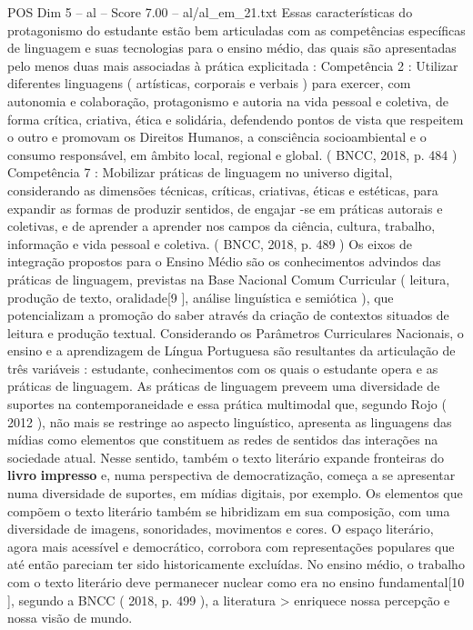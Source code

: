 \begin{textsample}{POS Dim 5 – al – Score 7.00 – al/al\_em\_21.txt}
Essas características do protagonismo do estudante estão bem articuladas com as competências específicas de linguagem e suas tecnologias para o ensino médio, das quais são apresentadas pelo menos duas mais associadas à prática explicitada : Competência 2 : Utilizar diferentes linguagens ( artísticas, corporais e verbais ) para exercer, com autonomia e colaboração, protagonismo e autoria na vida pessoal e coletiva, de forma crítica, criativa, ética e solidária, defendendo pontos de vista que respeitem o outro e promovam os Direitos Humanos, a consciência socioambiental e o consumo responsável, em âmbito local, regional e global. ( BNCC, 2018, p. 484 ) Competência 7 : Mobilizar práticas de linguagem no universo digital, considerando as dimensões técnicas, críticas, criativas, éticas e estéticas, para expandir as formas de produzir sentidos, de engajar -se em práticas autorais e coletivas, e de aprender a aprender nos campos da ciência, cultura, trabalho, informação e vida pessoal e coletiva. ( BNCC, 2018, p. 489 ) Os eixos de integração propostos para o Ensino Médio são os conhecimentos advindos das práticas de linguagem, previstas na Base Nacional Comum Curricular ( leitura, produção de texto, oralidade[9 ], análise linguística e semiótica ), que potencializam a promoção do saber através da criação de contextos situados de leitura e produção textual.
Considerando os Parâmetros Curriculares Nacionais, o ensino e a aprendizagem de Língua Portuguesa são resultantes da articulação de três variáveis : estudante, conhecimentos com os quais o estudante opera e as práticas de linguagem.
As práticas de linguagem preveem uma diversidade de suportes na contemporaneidade e essa prática multimodal que, segundo Rojo ( 2012 ), não mais se restringe ao aspecto linguístico, apresenta as linguagens das mídias como elementos que constituem as redes de sentidos das interações na sociedade atual.
Nesse sentido, também o texto literário expande fronteiras do \textbf{livro} \textbf{impresso} e, numa perspectiva de democratização, começa a se apresentar numa diversidade de suportes, em mídias digitais, por exemplo.
Os elementos que compõem o texto literário também se hibridizam em sua composição, com uma diversidade de imagens, sonoridades, movimentos e cores.
O espaço literário, agora mais acessível e democrático, corrobora com representações populares que até então pareciam ter sido historicamente excluídas.
No ensino médio, o trabalho com o texto literário deve permanecer nuclear como era no ensino fundamental[10 ], segundo a BNCC ( 2018, p. 499 ), a literatura > enriquece nossa percepção e nossa visão de mundo.

\end{textsample}
